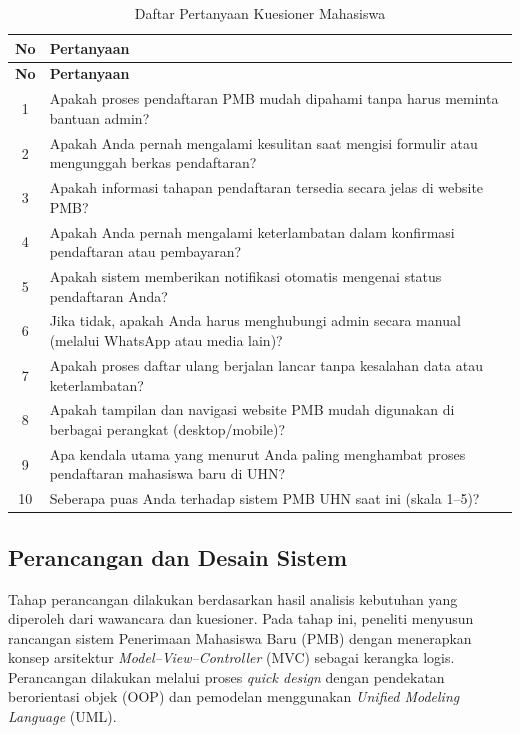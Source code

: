 \begin{longtable}{|c|p{}|}
	\caption{Daftar Pertanyaan Kuesioner Mahasiswa}
	\label{table:3.kuesioner}\\
	\hline
	\textbf{No} & \textbf{Pertanyaan} \\
	\hline
	\endfirsthead
	\hline
	\textbf{No} & \textbf{Pertanyaan} \\
	\hline
	\endhead
	1 & Apakah proses pendaftaran PMB mudah dipahami tanpa harus meminta bantuan admin? \\
	\hline
	2 & Apakah Anda pernah mengalami kesulitan saat mengisi formulir atau mengunggah berkas pendaftaran? \\
	\hline
	3 & Apakah informasi tahapan pendaftaran tersedia secara jelas di website PMB? \\
	\hline
	4 & Apakah Anda pernah mengalami keterlambatan dalam konfirmasi pendaftaran atau pembayaran? \\
	\hline
	5 & Apakah sistem memberikan notifikasi otomatis mengenai status pendaftaran Anda? \\
	\hline
	6 & Jika tidak, apakah Anda harus menghubungi admin secara manual (melalui WhatsApp atau media lain)? \\
	\hline
	7 & Apakah proses daftar ulang berjalan lancar tanpa kesalahan data atau keterlambatan? \\
	\hline
	8 & Apakah tampilan dan navigasi website PMB mudah digunakan di berbagai perangkat (desktop/mobile)? \\
	\hline
	9 & Apa kendala utama yang menurut Anda paling menghambat proses pendaftaran mahasiswa baru di UHN? \\
	\hline
	10 & Seberapa puas Anda terhadap sistem PMB UHN saat ini (skala 1--5)? \\
	\hline
\end{longtable}

\subsection{Perancangan dan Desain Sistem} \label{III.PerancanganPrototype}
Tahap perancangan dilakukan berdasarkan hasil analisis kebutuhan yang diperoleh dari wawancara dan kuesioner. Pada tahap ini, peneliti menyusun rancangan sistem Penerimaan Mahasiswa Baru (PMB) dengan menerapkan konsep arsitektur \textit{Model--View--Controller} (MVC) sebagai kerangka logis. Perancangan dilakukan melalui proses \textit{quick design} dengan pendekatan berorientasi objek (OOP) dan pemodelan menggunakan \textit{Unified Modeling Language} (UML).\par


